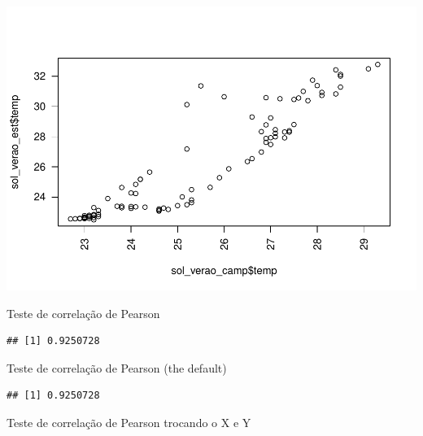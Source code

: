\documentclass[
]{book}
\newenvironment{Shaded}{\begin{snugshade}}{\end{snugshade}}
\newcommand{\DataTypeTok}[1]{\textcolor[rgb]{0.13,0.29,0.53}{#1}}
\newcommand{\KeywordTok}[1]{\textcolor[rgb]{0.13,0.29,0.53}{\textbf{#1}}}
\newcommand{\NormalTok}[1]{#1}
\newcommand{\OperatorTok}[1]{\textcolor[rgb]{0.81,0.36,0.00}{\textbf{#1}}}
\newcommand{\StringTok}[1]{\textcolor[rgb]{0.31,0.60,0.02}{#1}}
\begin{document}
\includegraphics{TudodoR_files/figure-latex/unnamed-chunk-263-1.pdf}

Teste de correlação de Pearson

\begin{Shaded}
\end{Shaded}

\begin{verbatim}
## [1] 0.9250728
\end{verbatim}

Teste de correlação de Pearson (the default)

\begin{Shaded}
\end{Shaded}

\begin{verbatim}
## [1] 0.9250728
\end{verbatim}

Teste de correlação de Pearson trocando o X e Y

\begin{Shaded}
\end{Shaded}
\end{document}
